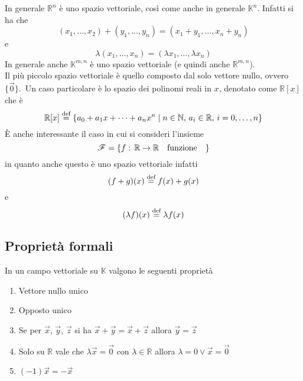In generale $\mathbb{R}^n$ è uno spazio vettoriale, così come anche in generale
$\mathbb{K}^n$. Infatti si ha che
\begin{equation*}
  (x_1,\ldots,x_2)+(y_1,\ldots,y_n) = (x_1+y_1,\ldots,x_n+y_n)
\end{equation*}
e
\begin{equation*}
  \lambda(x_1,\ldots,x_n) = (\lambda x_1,\ldots,\lambda x_n)
\end{equation*}
In generale anche $\mathbb{K}^{m,n}$ è uno spazio vettoriale (e quindi anche
$\mathbb{R}^{m,n}$).\\
Il più piccolo spazio vettoriale è quello composto dal solo vettore nullo, ovvero
$\{\vec{0}\}$.\
Un caso particolare è lo spazio dei polinomi reali in $x$, denotato come $\mathbb{R}[x]$
che è
\begin{equation*}
  \mathbb{R}[x]\bydef \left\{ a_0+a_1x+\cdots+a_n x^n\Setsuchthat
  n\in\mathbb{N},\,a_i\in\mathbb{R},\,i=0,\ldots,n \right\}
\end{equation*}
È anche interessante il caso in cui si consideri l'insieme
\begin{equation*}
  \mathscr{F} = \left\{ f:\,\mathbb{R}\to\mathbb{R}\qq{funzione} \right\}
\end{equation*}
in quanto anche questo è uno spazio vettoriale infatti
\begin{equation*}
  (f+g)(x)\overset{\text{def}}{=} f(x)+g(x)
\end{equation*}
e
\begin{equation*}
  (\lambda f)(x)\overset{\text{def}}{=} \lambda f(x)
\end{equation*}

\subsection{Proprietà formali}%
\label{sub:proprieta_formali}

In un campo vettoriale su $\mathbb{K}$ valgono le seguenti proprietà
\begin{enumerate}
  \item Vettore nullo unico
  \item Opposto unico
  \item Se per $\vec{x}$, $\vec{y}$, $\vec{z}$ si ha $\vec{x}+\vec{y}=\vec{x}+\vec{z}$
    allora $\vec{y}=\vec{z}$
  \item Solo su $\mathbb{R}$ vale che $\lambda\vec{x}=\vec{0}$ con
    $\lambda\in\mathbb{R}$ allora $\lambda=0\lor\vec{x}=\vec{0}$
  \item $(-1)\vec{x} = -\vec{x}$
\end{enumerate}
